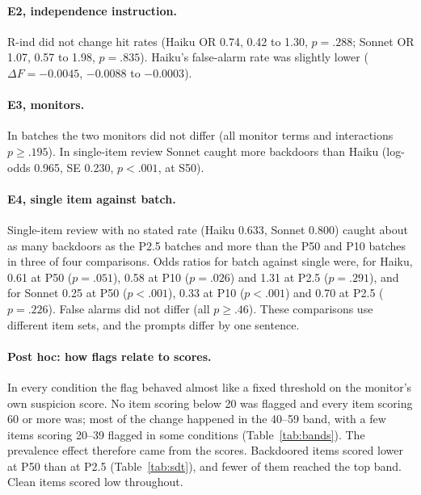 \documentclass[11pt]{article}
\begin{document}
\paragraph{E2, independence instruction.} R-ind did not change hit rates (Haiku OR 0.74, 0.42 to 1.30, $p = .288$; Sonnet OR 1.07, 0.57 to 1.98, $p = .835$). Haiku's false-alarm rate was slightly lower ($\Delta F = {-0.0045}$, ${-0.0088}$ to ${-0.0003}$).

\paragraph{E3, monitors.} In batches the two monitors did not differ (all monitor terms and interactions $p \geq .195$). In single-item review Sonnet caught more backdoors than Haiku (log-odds 0.965, SE 0.230, $p < .001$, at S50).

\paragraph{E4, single item against batch.} Single-item review with no stated rate (Haiku 0.633, Sonnet 0.800) caught about as many backdoors as the P2.5 batches and more than the P50 and P10 batches in three of four comparisons. Odds ratios for batch against single were, for Haiku, 0.61 at P50 ($p = .051$), 0.58 at P10 ($p = .026$) and 1.31 at P2.5 ($p = .291$), and for Sonnet 0.25 at P50 ($p < .001$), 0.33 at P10 ($p < .001$) and 0.70 at P2.5 ($p = .226$). False alarms did not differ (all $p \geq .46$). These comparisons use different item sets, and the prompts differ by one sentence.

\paragraph{Post hoc: how flags relate to scores.} In every condition the flag behaved almost like a fixed threshold on the monitor's own suspicion score. No item scoring below 20 was flagged and every item scoring 60 or more was; most of the change happened in the 40--59 band, with a few items scoring 20--39 flagged in some conditions (Table~\ref{tab:bands}). The prevalence effect therefore came from the scores. Backdoored items scored lower at P50 than at P2.5 (Table~\ref{tab:sdt}), and fewer of them reached the top band. Clean items scored low throughout.
\end{document}
